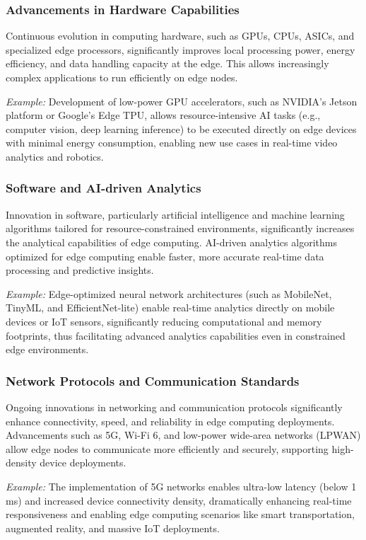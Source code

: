 \documentclass[runningheads]{llncs}
\begin{document}
\subsubsection{Advancements in Hardware Capabilities}
Continuous evolution in computing hardware, such as GPUs, CPUs, ASICs, and specialized edge processors, significantly improves local processing power, energy efficiency, and data handling capacity at the edge. This allows increasingly complex applications to run efficiently on edge nodes.

\textit{Example:} Development of low-power GPU accelerators, such as NVIDIA's Jetson platform or Google's Edge TPU, allows resource-intensive AI tasks (e.g., computer vision, deep learning inference) to be executed directly on edge devices with minimal energy consumption, enabling new use cases in real-time video analytics and robotics.

\subsubsection{Software and AI-driven Analytics}
Innovation in software, particularly artificial intelligence and machine learning algorithms tailored for resource-constrained environments, significantly increases the analytical capabilities of edge computing. AI-driven analytics algorithms optimized for edge computing enable faster, more accurate real-time data processing and predictive insights.

\textit{Example:} Edge-optimized neural network architectures (such as MobileNet, TinyML, and EfficientNet-lite) enable real-time analytics directly on mobile devices or IoT sensors, significantly reducing computational and memory footprints, thus facilitating advanced analytics capabilities even in constrained edge environments.

\subsubsection{Network Protocols and Communication Standards}
Ongoing innovations in networking and communication protocols significantly enhance connectivity, speed, and reliability in edge computing deployments. Advancements such as 5G, Wi-Fi 6, and low-power wide-area networks (LPWAN) allow edge nodes to communicate more efficiently and securely, supporting high-density device deployments.

\textit{Example:} The implementation of 5G networks enables ultra-low latency (below 1 ms) and increased device connectivity density, dramatically enhancing real-time responsiveness and enabling edge computing scenarios like smart transportation, augmented reality, and massive IoT deployments.
\end{document}
